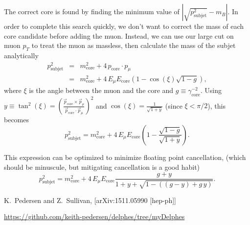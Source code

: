 \documentclass[10pt]{article}
\newcommand{\pT}{p_{T}^{}}
\newcommand{\pSubjet}[1][] {p_{\mathrm{subjet}}^{#1}}
\newcommand{\pCore}[1][]   {p_{\mathrm{core}}^{#1}}
\newcommand{\pCoreV}       {\vec{p}_{\mathrm{core}}^{}}
\newcommand{\pMu}[1][]     {p_{\mu}^{#1}}
\newcommand{\pMuV}       {\vec{p}_{\mu}^{}}
\newcommand{\mCore}[1][]     {m_{\mathrm{core}}^{#1}}
\newcommand{\ECore}[1][]     {E_{\mathrm{core}}^{#1}}
\newcommand{\gammaCore}[1][] {\gamma_{\mathrm{core}}^{#1}}
\newcommand{\EMu}[1][]       {E_{\mu}^{#1}}
\begin{document}
The correct core is found by finding the minimum value of 
$\left|\sqrt{\pSubjet[2]}-m_B^{}\right|$. In order to complete this search 
quickly, we don't want to correct the mass of each core candidate before
adding the muon. Instead, we can use our large cut on muon $\pT$ to treat
the muon as massless, then calculate the mass of the subjet analytically
%
\begin{eqnarray}
\pSubjet[2] & = & \mCore[2]+4\,\pCore\cdot\pMu \nonumber \\
& = & \mCore[2]+4\,\EMu\ECore(1-\cos(\xi)\sqrt{1-g}),
\end{eqnarray}
%
where $\xi$ is the angle between the muon and the core and $g\equiv\gammaCore[-2]$.
Using $y\equiv\tan^{2}(\xi)=\left(\frac{\pCoreV\times\pMuV}{\pCoreV\cdot\pMuV}\right)^2$
and $\cos(\xi)=\frac{1}{\sqrt{1+y}}$ (since $\xi<\pi/2$), this becomes
%
\begin{equation}
\pSubjet[2]=\mCore[2]+4\,\EMu\ECore(1-\frac{\sqrt{1-g}}{\sqrt{1+y}}).
\end{equation}
%

This expression can be optimized to minimize floating point cancellation,
(which should be minuscule, but mitigating cancellation is a good habit)
%
\begin{equation}
\pSubjet[2]=\mCore[2]+4\,\EMu\ECore\frac{g+y}{1+y+\sqrt{1-((g-y)+g\,y)}}.
\end{equation}

\begin{thebibliography}{}

  K.~Pedersen and Z.~Sullivan,
  [arXiv:1511.05990 [hep-ph]]

  \url{https://github.com/keith-pedersen/delphes/tree/myDelphes}

\end{thebibliography}
\end{document}
